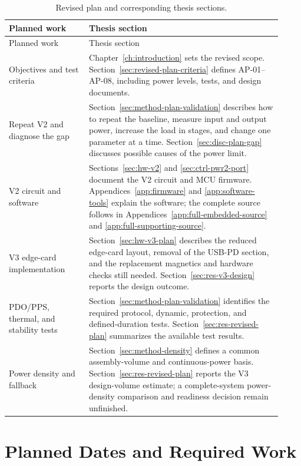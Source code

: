 \begingroup
\small
\begin{longtable}{@{}L{0.27\linewidth}L{0.65\linewidth}@{}}
\caption[Revised plan and thesis sections.]{Revised plan and corresponding thesis sections.}
\label{tab:plan-thesis-map}\\
\toprule Planned work & Thesis section\\\midrule
\endfirsthead
\toprule Planned work & Thesis section\\\midrule
\endhead
Objectives and test criteria & Chapter~\ref{ch:introduction} sets the revised scope. Section~\ref{sec:revised-plan-criteria} defines AP-01--AP-08, including power levels, tests, and design documents.\\
Repeat V2 and diagnose the gap & Section~\ref{sec:method-plan-validation} describes how to repeat the baseline, measure input and output power, increase the load in stages, and change one parameter at a time. Section~\ref{sec:disc-plan-gap} discusses possible causes of the power limit.\\
V2 circuit and software & Sections~\ref{sec:hw-v2} and \ref{sec:ctrl-pwr2-port} document the V2 circuit and MCU firmware. Appendices~\ref{app:firmware} and \ref{app:software-tools} explain the software; the complete source follows in Appendices~\ref{app:full-embedded-source} and \ref{app:full-supporting-source}.\\
V3 edge-card implementation & Section~\ref{sec:hw-v3-plan} describes the reduced edge-card layout, removal of the USB-PD section, and the replacement magnetics and hardware checks still needed. Section~\ref{sec:res-v3-design} reports the design outcome.\\
PDO/PPS, thermal, and stability tests & Section~\ref{sec:method-plan-validation} identifies the required protocol, dynamic, protection, and defined-duration tests. Section~\ref{sec:res-revised-plan} summarizes the available test results.\\
Power density and fallback & Section~\ref{sec:method-density} defines a common assembly-volume and continuous-power basis. Section~\ref{sec:res-revised-plan} reports the V3 design-volume estimate; a complete-system power-density comparison and readiness decision remain unfinished.\\
\bottomrule
\end{longtable}
\endgroup

\section{Planned Dates and Required Work}

